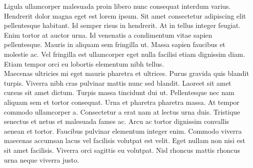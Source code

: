 \documentclass{article}
\begin{document}
Ligula ullamcorper malesuada proin libero nunc consequat interdum varius. Hendrerit dolor magna eget est lorem ipsum. Sit amet consectetur adipiscing elit pellentesque habitant. Id semper risus in hendrerit. At in tellus integer feugiat. Enim tortor at auctor urna. Id venenatis a condimentum vitae sapien pellentesque. Mauris in aliquam sem fringilla ut. Massa sapien faucibus et molestie ac. Vel fringilla est ullamcorper eget nulla facilisi etiam dignissim diam. Etiam tempor orci eu lobortis elementum nibh tellus.\\

Maecenas ultricies mi eget mauris pharetra et ultrices. Purus gravida quis blandit turpis. Viverra nibh cras pulvinar mattis nunc sed blandit. Laoreet sit amet cursus sit amet dictum. Turpis massa tincidunt dui ut. Pellentesque nec nam aliquam sem et tortor consequat. Urna et pharetra pharetra massa. At tempor commodo ullamcorper a. Consectetur a erat nam at lectus urna duis. Tristique senectus et netus et malesuada fames ac. Arcu ac tortor dignissim convallis aenean et tortor. Faucibus pulvinar elementum integer enim. Commodo viverra maecenas accumsan lacus vel facilisis volutpat est velit. Eget nullam non nisi est sit amet facilisis. Viverra orci sagittis eu volutpat. Nisl rhoncus mattis rhoncus urna neque viverra justo.\\
\end{document}

